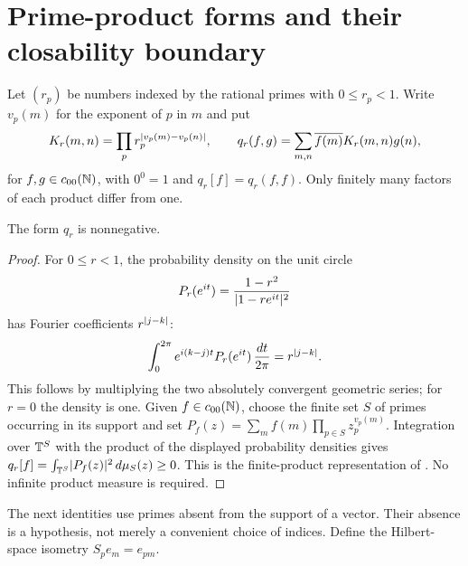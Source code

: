 \section{Prime-product forms and their closability boundary}
\label{sec:product}

Let $(r_p)$ be numbers indexed by the rational primes with $0\le r_p<1$.
Write $v_p(m)$ for the exponent of $p$ in $m$ and put
\begin{equation}
 K_r(m,n)=\prod_p r_p^{\lvert v_p(m)-v_p(n)\rvert},
 \qquad
 q_r(f,g)=\sum_{m,n}\overline{f(m)}K_r(m,n)g(n),
 \label{eq:product}
\end{equation}
for $f,g\in c_{00}(\mathbb{N})$, with $0^0=1$ and $q_r[f]=q_r(f,f)$.
Only finitely many factors of each product differ from one.

\begin{lemma}
\label{lem:positive}
The form $q_r$ is nonnegative.
\end{lemma}
\begin{proof}
For $0\le r<1$, the probability density on the unit circle
\[
 P_r(e^{it})=\frac{1-r^2}{\lvert 1-re^{it}\rvert^2}
\]
has Fourier coefficients $r^{\lvert j-k\rvert}$:
\[
 \int_0^{2\pi}e^{i(k-j)t}P_r(e^{it})\,\frac{dt}{2\pi}
 =r^{\lvert j-k\rvert}.
\]
This follows by multiplying the two absolutely convergent geometric
series; for $r=0$ the density is one. Given $f\in c_{00}(\mathbb{N})$, choose the finite
set $S$ of primes occurring in its support and set
$P_f(z)=\sum_m f(m)\prod_{p\in S}z_p^{v_p(m)}$.
Integration over $\mathbb{T}^S$ with the product of the displayed probability
densities gives $q_r[f]=\int_{\mathbb{T}^S}\lvert P_f(z)\rvert^2\,d\mu_S(z)\ge0$.
This is the finite-product representation of
\citet[Section~3, Lemma~1 in the consulted preprint]{aistleitner2015gcd}.
No infinite product measure is required.
\end{proof}

The next identities use primes absent from the support of a vector.
Their absence is a hypothesis, not merely a convenient choice of indices.
Define the Hilbert-space isometry $S_pe_m=e_{pm}$.

